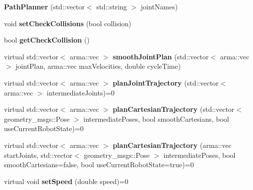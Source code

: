 \begin{DoxyCompactItemize}
\item 
{\bfseries Path\+Planner} (std\+::vector$<$ std\+::string $>$ joint\+Names)\hypertarget{classkukadu_1_1PathPlanner_a1d5ea50e4e1e45b4feb02f3507152540}{}\label{classkukadu_1_1PathPlanner_a1d5ea50e4e1e45b4feb02f3507152540}

\item 
void {\bfseries set\+Check\+Collisions} (bool collision)\hypertarget{classkukadu_1_1PathPlanner_a64bdab84aa8cf63b4c3a50f6ae0a9d7d}{}\label{classkukadu_1_1PathPlanner_a64bdab84aa8cf63b4c3a50f6ae0a9d7d}

\item 
bool {\bfseries get\+Check\+Collision} ()\hypertarget{classkukadu_1_1PathPlanner_ad807f61926f499a4b7dd277303156807}{}\label{classkukadu_1_1PathPlanner_ad807f61926f499a4b7dd277303156807}

\item 
virtual std\+::vector$<$ arma\+::vec $>$ {\bfseries smooth\+Joint\+Plan} (std\+::vector$<$ arma\+::vec $>$ joint\+Plan, arma\+::vec max\+Velocities, double cycle\+Time)\hypertarget{classkukadu_1_1PathPlanner_a85f304bce58b35715520a9ddfa02a843}{}\label{classkukadu_1_1PathPlanner_a85f304bce58b35715520a9ddfa02a843}

\item 
virtual std\+::vector$<$ arma\+::vec $>$ {\bfseries plan\+Joint\+Trajectory} (std\+::vector$<$ arma\+::vec $>$ intermediate\+Joints)=0\hypertarget{classkukadu_1_1PathPlanner_ab757c9af3406da8180bef68597b83542}{}\label{classkukadu_1_1PathPlanner_ab757c9af3406da8180bef68597b83542}

\item 
virtual std\+::vector$<$ arma\+::vec $>$ {\bfseries plan\+Cartesian\+Trajectory} (std\+::vector$<$ geometry\+\_\+msgs\+::\+Pose $>$ intermediate\+Poses, bool smooth\+Cartesians, bool use\+Current\+Robot\+State)=0\hypertarget{classkukadu_1_1PathPlanner_a959eb5545d65fdc108fdecad5d9d8542}{}\label{classkukadu_1_1PathPlanner_a959eb5545d65fdc108fdecad5d9d8542}

\item 
virtual std\+::vector$<$ arma\+::vec $>$ {\bfseries plan\+Cartesian\+Trajectory} (arma\+::vec start\+Joints, std\+::vector$<$ geometry\+\_\+msgs\+::\+Pose $>$ intermediate\+Poses, bool smooth\+Cartesians=false, bool use\+Current\+Robot\+State=true)=0\hypertarget{classkukadu_1_1PathPlanner_a7b3cf9ab52478e3d1775a17c9a6240e0}{}\label{classkukadu_1_1PathPlanner_a7b3cf9ab52478e3d1775a17c9a6240e0}

\item 
virtual void {\bfseries set\+Speed} (double speed)=0\hypertarget{classkukadu_1_1PathPlanner_a73771852ce2d30556eca8ce726a8c652}{}\label{classkukadu_1_1PathPlanner_a73771852ce2d30556eca8ce726a8c652}

\end{DoxyCompactItemize}
